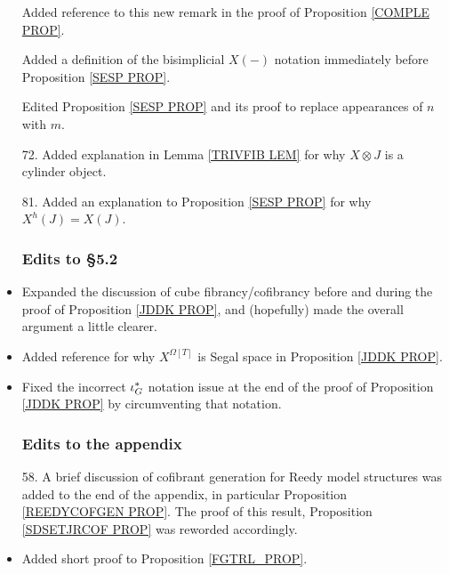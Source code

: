 \documentclass{article}
\begin{document}
\begin{itemize}
Added reference to this new remark in the proof of Proposition \ref{COMPLE PROP}.

Added a definition of the bisimplicial $X(-)$ notation immediately before Proposition \ref{SESP PROP}.

Edited Proposition \ref{SESP PROP} and its proof to replace appearances of $n$ with $m$. %

\item[72.] Added explanation in Lemma \ref{TRIVFIB LEM} for why $X \otimes J$ is a cylinder object. %

\item[81.] Added an explanation to Proposition \ref{SESP PROP} for why $X^h(J) = X(J)$. %
      

      
      
      \subsubsection*{Edits to \S 5.2}
\item Expanded the discussion of cube fibrancy/cofibrancy before and during the proof of Proposition \ref{JDDK PROP}, and (hopefully) made the overall argument a little clearer. %
      
\item Added reference for why $X^{\Omega[T]}$ is Segal space in Proposition \ref{JDDK PROP}. %

\item Fixed the incorrect $\iota^{\**}_G$ notation issue at the end of the proof of Proposition \ref{JDDK PROP} by circumventing that notation. %



      
      \subsubsection*{Edits to the appendix}
\item[58.] A brief discussion of cofibrant generation for Reedy model structures was added to the end of the appendix, in particular Proposition \ref{REEDYCOFGEN PROP}. The proof of this result, Proposition \ref{SDSETJRCOF PROP} was reworded accordingly. %
      
\item Added short proof to Proposition \ref{FGTRL_PROP}. %


      


\end{itemize}
\end{document}
